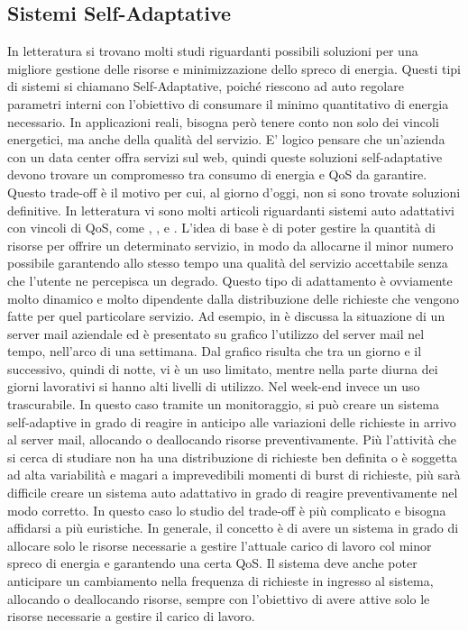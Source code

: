 \subsection{Sistemi Self-Adaptative}
In letteratura si trovano molti studi riguardanti possibili soluzioni per una migliore gestione delle risorse e minimizzazione dello spreco di energia. Questi tipi di sistemi si chiamano Self-Adaptative, poiché riescono ad auto regolare parametri interni con l'obiettivo di consumare il minimo quantitativo di energia necessario. In applicazioni reali, bisogna però tenere conto non solo dei vincoli energetici, ma anche della qualità del servizio. E' logico pensare che un'azienda con un data center offra servizi sul web, quindi queste soluzioni self-adaptative devono trovare un compromesso tra consumo di energia e \acf{QoS} da garantire. Questo trade-off è il motivo per cui, al giorno d'oggi, non si sono trovate soluzioni definitive. In letteratura vi sono molti articoli riguardanti sistemi auto adattativi con vincoli di \acs{QoS}, come \cite{PerezMirandolaMers2007-qosbw}, \cite{MarzollaMirandola2013-dpm}, \cite{PerezMirandolaMerseguer2014-relQoSandSWadapt} e \cite{PerezMirandolaMerseguer2014-QoSandPetriNets}. L'idea di base è di poter gestire la quantità di risorse per offrire un determinato servizio, in modo da allocarne il minor numero possibile garantendo allo stesso tempo una qualità del servizio accettabile senza che l'utente ne percepisca un degrado. Questo tipo di adattamento è ovviamente molto dinamico e molto dipendente dalla distribuzione delle richieste che vengono fatte per quel particolare servizio. Ad esempio, in \cite{PerezMirandolaMerseguer2014-QoSandPetriNets} è discussa la situazione di un server mail aziendale ed è presentato su grafico l'utilizzo del server mail nel tempo, nell'arco di una settimana. Dal grafico risulta che tra un giorno e il successivo, quindi di notte, vi è un uso limitato, mentre nella parte diurna dei giorni lavorativi si hanno alti livelli di utilizzo. Nel week-end invece un uso trascurabile. In questo caso tramite un monitoraggio, si può creare un sistema self-adaptive in grado di reagire in anticipo alle variazioni delle richieste in arrivo al server mail, allocando o deallocando risorse preventivamente. Più l'attività che si cerca di studiare non ha una distribuzione di richieste ben definita o è soggetta ad alta variabilità e magari a imprevedibili momenti di burst di richieste, più sarà difficile creare un sistema auto adattativo in grado di reagire preventivamente nel modo corretto. In questo caso lo studio del trade-off è più complicato e bisogna affidarsi a più euristiche. In generale, il concetto è di avere un sistema in grado di allocare solo le risorse necessarie a gestire l'attuale carico di lavoro col minor spreco di energia e garantendo una certa \acs{QoS}. Il sistema deve anche poter anticipare un cambiamento nella frequenza di richieste in ingresso al sistema, allocando o deallocando risorse, sempre con l'obiettivo di avere attive solo le risorse necessarie a gestire il carico di lavoro.

